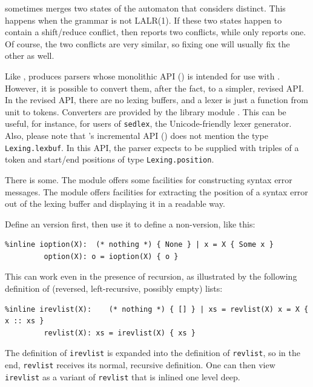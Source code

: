 \documentclass[onecolumn,11pt,nocopyrightspace,preprint]{sigplanconf}
\begin{document}
 \ocamlyacc sometimes merges two states
of the automaton that \menhir considers distinct. This happens
when the grammar is not LALR(1). If these two states happen to
contain a shift/reduce conflict, then \menhir reports two conflicts,
while \ocamlyacc only reports one. Of course, the two conflicts are
very similar, so fixing one will usually fix the other as well.

 Like \ocamlyacc, \menhir produces parsers whose monolithic API
() is intended for use with \ocamllex. However, it is
possible to convert them, after the fact, to a simpler, revised API. In the
revised API, there are no lexing buffers, and a lexer is just a function from
unit to tokens. Converters are provided by the library module
\menhirlibconvert. This can be useful, for instance, for users of
\texttt{sedlex}, the Unicode-friendly lexer generator. Also, please note that \menhir's
incremental API () does not mention the type
\verb+Lexing.lexbuf+. In this API, the parser expects to be supplied with
triples of a token and start/end positions of type \verb+Lexing.position+.

There is some.
The module \menhirliberrorreports offers some facilities for constructing
syntax error messages. The module \menhirliblexerutil offers facilities for
extracting the position of a syntax error out of the lexing buffer and
displaying it in a readable way.

 Define an \dinline version first, then use it to
define a non-\dinline version, like this:
\begin{verbatim}
%inline ioption(X):  (* nothing *) { None } | x = X { Some x }
         option(X): o = ioption(X) { o }
\end{verbatim}
This can work even in the presence of recursion, as illustrated by the
following definition of (reversed, left-recursive, possibly empty) lists:
\begin{verbatim}
%inline irevlist(X):    (* nothing *) { [] } | xs = revlist(X) x = X { x :: xs }
         revlist(X): xs = irevlist(X) { xs }
\end{verbatim}
The definition of \verb+irevlist+ is expanded into the definition of \verb+revlist+,
so in the end, \verb+revlist+ receives its normal, recursive definition. One can
then view \verb+irevlist+ as a variant of \verb+revlist+ that is inlined one level
deep.
\end{document}
